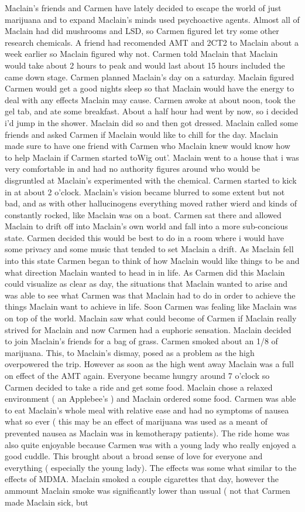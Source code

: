 \documentclass[12pt]{book}
\begin{document}
Maclain's friends and Carmen have lately decided to escape the world of just marijuana and to expand Maclain's minds used psychoactive agents. Almost all of Maclain had did mushrooms and LSD, so Carmen figured let try some other research chemicals. A friend had recomended AMT and 2CT2 to Maclain about a week earlier so Maclain figured why not. Carmen told Maclain that Maclain would take about 2 hours to peak and would last about 15 hours included the came down stage. Carmen planned Maclain's day on a saturday. Maclain figured Carmen would get a good nights sleep so that Maclain would have the energy to deal with any effects Maclain may cause. Carmen awoke at about noon, took the gel tab, and ate some breakfast. About a half hour had went by now, so i decided i'd jump in the shower. Maclain did so and then got dressed. Maclain called some friends and asked Carmen if Maclain would like to chill for the day. Maclain made sure to have one friend with Carmen who Maclain knew would know how to help Maclain if Carmen started toWig out'. Maclain went to a house that i was very comfortable in and had no authority figures around who would be disgruntled at Maclain's experimented with the chemical. Carmen started to kick in at about 2 o'clock. Maclain's vision became blurred to some extent but not bad, and as with other hallucinogens everything moved rather wierd and kinds of constantly rocked, like Maclain was on a boat. Carmen sat there and allowed Maclain to drift off into Maclain's own world and fall into a more sub-concious state. Carmen decided this would be best to do in a room where i would have some privacy and some music that tended to set Maclain a drift. As Maclain fell into this state Carmen began to think of how Maclain would like things to be and what direction Maclain wanted to head in in life. As Carmen did this Maclain could visualize as clear as day, the situations that Maclain wanted to arise and was able to see what Carmen was that Maclain had to do in order to achieve the things Maclain want to achieve in life. Soon Carmen was fealing like Maclain was on top of the world. Maclain saw what could become of Carmen if Maclain really strived for Maclain and now Carmen had a euphoric sensation. Maclain decided to join Maclain's friends for a bag of grass. Carmen smoked about an 1/8 of marijuana. This, to Maclain's dismay, posed as a problem as the high overpowered the trip. However as soon as the high went away Maclain was a full on effect of the AMT again. Everyone became hungry around 7 o'clock so Carmen decided to take a ride and get some food. Maclain chose a relaxed environment ( an Applebee's ) and Maclain ordered some food. Carmen was able to eat Maclain's whole meal with relative ease and had no symptoms of nausea what so ever ( this may be an effect of marijuana was used as a meant of prevented nausea as Maclain was in kemotherapy patients). The ride home was also quite enjoyable because Carmen was with a young lady who really enjoyed a good cuddle. This brought about a broad sense of love for everyone and everything ( especially the young lady). The effects was some what similar to the effects of MDMA. Maclain smoked a couple cigarettes that day, however the ammount Maclain smoke was significantly lower than ussual ( not that Carmen made Maclain sick, but 
\end{document}
